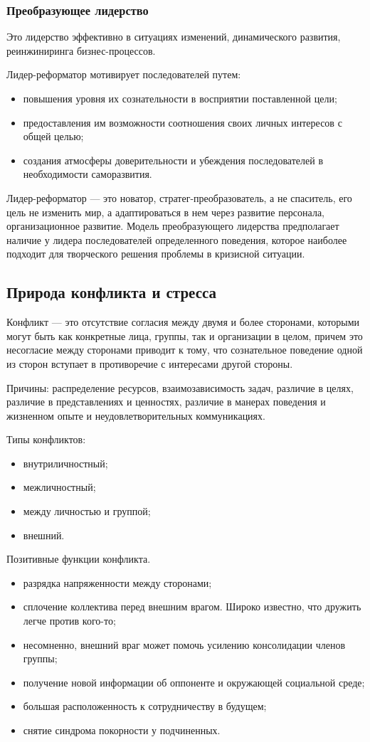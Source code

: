 \documentclass[a4paper,12pt,oneside,final]{extarticle}
\numberwithin{equation}{section}
\begin{document}
\subsubsection{Преобразующее лидерство} 
Это лидерство эффективно в ситуациях изменений, динамического развития, реинжиниринга бизнес-процессов. 

Лидер-реформатор мотивирует последователей путем:
\begin{itemize}
	\item повышения уровня их сознательности в восприятии поставленной цели;
	\item предоставления им возможности соотношения своих личных интересов с общей целью;
	\item создания атмосферы доверительности и убеждения последователей в необходимости саморазвития. 
\end{itemize}

Лидер-реформатор --- это новатор, стратег-преобразователь, а не спаситель, его цель не изменить мир, а адаптироваться в нем через развитие персонала, организационное развитие. 
Модель преобразующего лидерства предполагает наличие у лидера последователей определенного поведения, которое наиболее подходит для творческого решения проблемы в кризисной ситуации.

\subsection{Природа конфликта и стресса}
Конфликт --- это отсутствие согласия между двумя и более сторонами, которыми могут быть как конкретные лица, группы, так и организации в целом, причем это несогласие между сторонами приводит к тому, что сознательное поведение одной из сторон вступает в противоречие с интересами другой стороны.

Причины: распределение ресурсов, взаимозависимость задач, различие в целях, различие в представлениях и ценностях, различие в манерах поведения и жизненном опыте и неудовлетворительных коммуникациях.

Типы конфликтов:
\begin{itemize}
	\item внутриличностный;
	\item межличностный;
	\item между личностью и группой;
	\item внешний.
\end{itemize}

Позитивные функции конфликта.
\begin{itemize}
	\item разрядка напряженности между сторонами;
	\item сплочение коллектива перед внешним врагом. Широко известно, что дружить легче против кого-то;
	\item несомненно, внешний враг может помочь усилению консолидации членов группы;
	\item получение новой информации об оппоненте и окружающей социальной среде;
	\item большая расположенность к сотрудничеству в будущем;
	\item снятие синдрома покорности у подчиненных.
\end{itemize}
\end{document}
